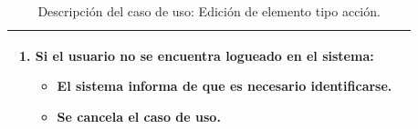 \begin{table}[H]
\begin{center}
\begin{tabular}{|p{3.5cm}|p{10cm}|}
{\begin{enumerate}
\begin{itemize}
	    \item Se cancela el caso de uso.
	  \end{itemize}
	\item Si el usuario no se encuentra logueado en el sistema:
	\begin{itemize}
	  \item El sistema informa de que es necesario identificarse.
	  \item Se cancela el caso de uso.
	\end{itemize}
	\end{enumerate}
	}\\
      \hline
    \end{tabular}
  \end{center}
\caption{Descripción del caso de uso: Edición de elemento tipo acción.}
\end{table}


